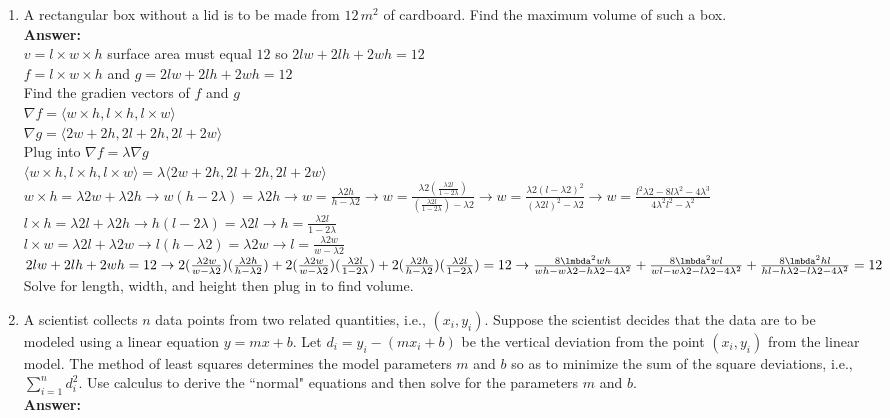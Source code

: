 \documentclass[11pt]{article}
\begin{document}
\begin{enumerate}
    \item A rectangular box without a lid is to be made from $12 \, m^2$ of cardboard.  Find the maximum volume of such a box.
    \\
    \textbf{Answer:}
    \\
    $v=l \times w \times h $ surface area must equal $12$ so $2lw+2lh+2wh=12$
    \\
    $f=l \times w \times h$ and $g=2lw+2lh+2wh=12$
    \\
    Find the gradien vectors of $f$ and $g$
    \\
    $\nabla f= \langle w \times h,l \times h, l \times w \rangle$
    \\
    $\nabla g= \langle 2w+2h, 2l+2h, 2l+2w \rangle $
    \\
    Plug into $\nabla f= \lambda \nabla g$
    \\
    $\langle w \times h,l \times h, l \times w \rangle= \lambda \langle 2w+2h, 2l+2h, 2l+2w \rangle$
    \\
    $w \times h= \lambda 2w+ \lambda 2h \rightarrow w(h- 2 \lambda)= \lambda 2h \rightarrow w= \frac{\lambda 2 h}{h-\lambda 2} \rightarrow w= \frac{\lambda 2 (\frac{\lambda 2 l}{1-2 \lambda})}{(\frac{\lambda 2 l}{1-2 \lambda})-\lambda 2} \rightarrow w= \frac{\lambda 2 (l- \lambda 2)^2}{(\lambda 2l)^2-\lambda 2} \rightarrow  w= \frac{l^2\lambda 2-8l\lambda^2-4 \lambda^3 }{4 \lambda^2l^2-\lambda^2}$
    \\
    $l \times h= \lambda 2l + \lambda 2h \rightarrow h(l-2 \lambda)=\lambda 2 l \rightarrow h= \frac{\lambda 2 l}{1-2 \lambda}$
    \\
    $l \times w= \lambda 2l + \lambda 2w \rightarrow l(h- \lambda 2)=\lambda 2w \rightarrow l= \frac{\lambda 2w}{w- \lambda 2}$
    \\
    $2lw+2lh+2wh=12 \rightarrow 2(\frac{\lambda 2w}{w- \lambda 2})(\frac{\lambda 2 h}{h-\lambda 2})+2(\frac{\lambda 2w}{w- \lambda 2})(\frac{\lambda 2 l}{1-2 \lambda})+2(\frac{\lambda 2 h}{h-\lambda 2})(\frac{\lambda 2 l}{1-2 \lambda})=12 \rightarrow \frac{8 \lmbda^2 wh}{wh-w\lambda 2-h \lambda 2 - 4 \lambda^2}+\frac{8 \lmbda^2 wl}{wl-w\lambda 2-l \lambda 2 - 4 \lambda^2}+ \frac{8 \lmbda^2 hl}{hl-h\lambda 2-l \lambda 2 - 4 \lambda^2}=12$
    \\
    Solve for length, width, and height then plug in to find volume.
    
    
    
    
    
    
    
    \item A scientist collects $n$ data points from two related quantities, i.e., $(x_i, y_i)$.  Suppose the scientist decides that the data are to be modeled using a linear equation $y=mx+b$.  Let $d_i = y_i - (mx_i +b)$ be the vertical deviation from the point $(x_i, y_i)$ from the linear model.  The method of least squares determines the model parameters $m$ and $b$ so as to minimize the sum of the square deviations, i.e.,  $\sum \limits_{i=1}^n d_i^2$.  Use calculus to derive the ``normal" equations and then solve for the parameters $m$ and $b$.
    \\
    \textbf{Answer:}
    \\
    

\end{enumerate}
\end{document}
